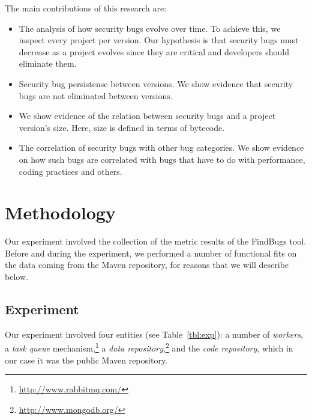 \documentclass[conference]{llncs}
\begin{document}
The main contributions of this research are:
\begin{itemize}
	\item The analysis of how security bugs evolve over time. To achieve
this, we inspect every project per version. Our hypothesis is that security
bugs must decrease as a project evolves since they are critical and developers
should eliminate them.
	\item Security bug persistense between versions. We show evidence that
security bugs are not eliminated between versions.
	\item We show evidence of the relation between security bugs and a project
version's size.  Here, size is defined in terms of bytecode.
	\item The correlation of security bugs with other bug categories. We
show evidence on how such bugs are correlated with bugs that have to do with
performance, coding practices and others.
\end{itemize}


\section{Methodology}
\label{sec:meth}


Our experiment involved the collection of the metric results of the FindBugs
tool. Before and during the experiment, we performed a number of functional
fits on the data coming from the Maven repository, for reasons that we will describe below.

\subsection{Experiment}
\label{sec:exp}

Our experiment involved four entities (see Table~\ref{tbl:exp}):
a number of {\it workers}, a {\it task queue}
mechanism,\footnote{\url{http://www.rabbitmq.com/}}
a {\it data repository},\footnote{\url{http://www.mongodb.org/}}
and the {\it code repository}, which in our case it was
the public Maven repository.
\end{document}

